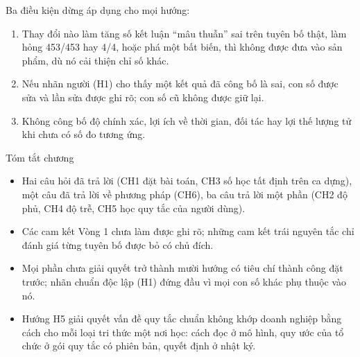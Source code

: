 Ba điều kiện dừng áp dụng cho mọi hướng:
\begin{enumerate}
\item Thay đổi nào làm tăng số kết luận “mâu thuẫn” sai trên tuyên bố thật, làm hỏng 453/453 hay 4/4, hoặc phá một bất biến, thì không được đưa vào sản phẩm, dù nó cải thiện chỉ số khác.
\item Nếu nhãn người (H1) cho thấy một kết quả đã công bố là sai, con số được sửa và lần sửa được ghi rõ; con số cũ không được giữ lại.
\item Không công bố độ chính xác, lợi ích về thời gian, đối tác hay lợi thế lượng tử khi chưa có số đo tương ứng.
\end{enumerate}

\FloatBarrier
\begin{hopy}{Tóm tắt chương}
\begin{itemize}
\item Hai câu hỏi đã trả lời (CH1 đặt bài toán, CH3 số học tất định trên ca dựng), một câu đã trả lời về phương pháp (CH6), ba câu trả lời một phần (CH2 độ phủ, CH4 độ trễ, CH5 học quy tắc của người dùng).
\item Các cam kết Vòng 1 chưa làm được ghi rõ; những cam kết trái nguyên tắc chỉ đánh giá từng tuyên bố được bỏ có chủ đích.
\item Mọi phần chưa giải quyết trở thành mười hướng có tiêu chí thành công đặt trước; nhãn chuẩn độc lập (H1) đứng đầu vì mọi con số khác phụ thuộc vào nó.
\item Hướng H5 giải quyết vấn đề quy tắc chuẩn không khớp doanh nghiệp bằng cách cho mỗi loại tri thức một nơi học: cách đọc ở mô hình, quy ước của tổ chức ở gói quy tắc có phiên bản, quyết định ở nhật ký.
\end{itemize}
\end{hopy}
